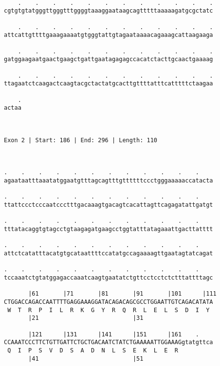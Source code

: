 \documentclass{article}
\begin{document}
\begin{Verbatim}
  
    .    .    .    .    .    .    .    .    .    .    .    .
cgtgtgtatgggttgggtttggggtaaaggaataagcagtttttaaaaagatgcgctatc
                                                            
    .    .    .    .    .    .    .    .    .    .    .    .
attcattgttttgaaagaaaatgtgggtattgtagaataaaacagaaagcattaagaaga
                                                            
    .    .    .    .    .    .    .    .    .    .    .    .
gatggaagaatgaactgaagctgattgaatagagagccacatctacttgcaactgaaaag
                                                            
    .    .    .    .    .    .    .    .    .    .    .    .
ttagaatctcaagactcaagtacgctactatgcacttgttttatttcatttttctaagaa
                                                            
    .
actaa
     
     
 
Exon 2 | Start: 186 | End: 296 | Length: 110



.    .    .    .    .    .    .    .    .    .    .    .    
agaataatttaaatatggaatgtttagcagtttgttttttccctgggaaaaaccatacta
                                                            
.    .    .    .    .    .    .    .    .    .    .    .    
ttattccctcccaatccctttgacaaagtgacagtcacattagttcagagatattgatgt
                                                            
.    .    .    .    .    .    .    .    .    .    .    .    
tttatacaggtgtagcctgtaagagatgaagcctggtatttatagaaattgacttatttt
                                                            
.    .    .    .    .    .    .    .    .    .    .    .    
attctcatatttacatgtgcataattttccatatgccagaaaagttgaatagtatcagat
                                                            
.    .    .    .    .    .    .    .    .    .    .    .    
tccaaatctgtatggagaccaaatcaagtgaatatctgttcctcctctctttattttagc
                                                            
       |61       |71       |81       |91       |101      |111
CTGGACCAGACCAATTTTGAGGAAAGGATACAGACAGCGCCTGGAATTGTCAGACATATA
 W  T  R  P  I  L  R  K  G  Y  R  Q  R  L  E  L  S  D  I  Y 
       |21                           |31                    
  
       |121      |131      |141      |151      |161    .    
CCAAATCCCTTCTGTTGATTCTGCTGACAATCTATCTGAAAAATTGGAAAGgtatgttca
 Q  I  P  S  V  D  S  A  D  N  L  S  E  K  L  E  R          
       |41                           |51                    
  

\end{Verbatim}
\end{document}
